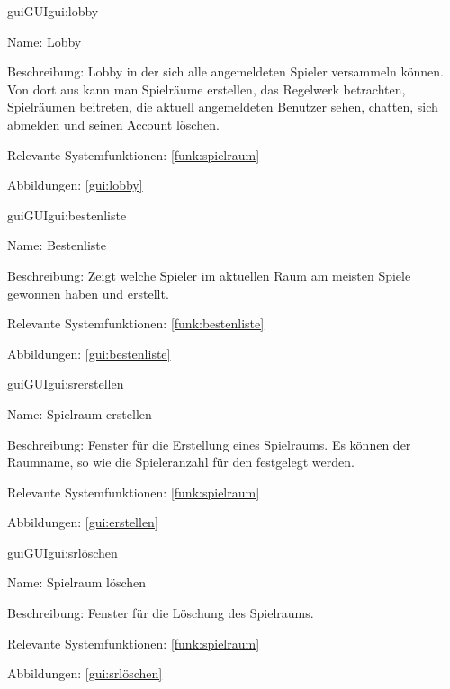 \begin{description}[leftmargin=5em, style=sameline]	
	\begin{lhp}{gui}{GUI}{gui:lobby}
		\item[Name:] Lobby 
		\item[Beschreibung:] Lobby in der sich alle angemeldeten Spieler versammeln können. Von dort aus kann man Spielräume erstellen, das Regelwerk betrachten, Spielräumen beitreten, die aktuell angemeldeten Benutzer sehen, chatten, sich abmelden und seinen Account löschen.  
		\item[Relevante Systemfunktionen:] \ref{funk:spielraum}
		\item[Abbildungen:] \ref{gui:lobby}
	\end{lhp}
\end{description}



\begin{description}[leftmargin=5em, style=sameline]	
	\begin{lhp}{gui}{GUI}{gui:bestenliste}
		\item[Name:] Bestenliste
		\item[Beschreibung:] Zeigt welche Spieler im aktuellen Raum am meisten Spiele gewonnen haben und erstellt.  
		\item[Relevante Systemfunktionen:] \ref{funk:bestenliste}
		\item[Abbildungen:] \ref{gui:bestenliste}
	\end{lhp}
\end{description}

\begin{description}[leftmargin=5em, style=sameline]	
	\begin{lhp}{gui}{GUI}{gui:srerstellen}
		\item[Name:] Spielraum erstellen
		\item[Beschreibung:]  Fenster für die Erstellung eines Spielraums. Es können der Raumname, so wie die Spieleranzahl für den festgelegt werden.
		\item[Relevante Systemfunktionen:] \ref{funk:spielraum}
		\item[Abbildungen:] \ref{gui:erstellen}
	\end{lhp}
\end{description}

\begin{description}[leftmargin=5em, style=sameline]	
	\begin{lhp}{gui}{GUI}{gui:srlöschen}
		\item[Name:] Spielraum löschen
		\item[Beschreibung:]  Fenster für die Löschung des Spielraums.
		\item[Relevante Systemfunktionen:] \ref{funk:spielraum}
		\item[Abbildungen:] \ref{gui:srlöschen}
	\end{lhp}
\end{description}


